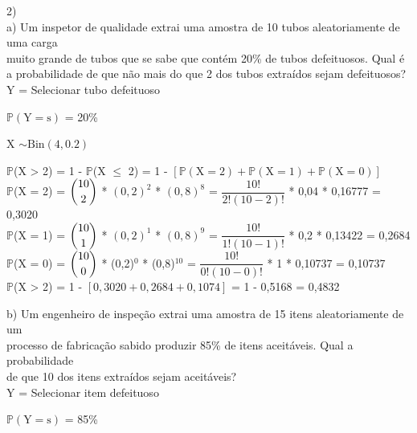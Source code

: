 \documentclass[12pt,a4paper,draft]{article}
\begin{document}
	2)\\
	a) Um inspetor de qualidade extrai uma amostra de 10 tubos aleatoriamente de uma carga\\ muito grande de tubos que se sabe que contém 20\% de tubos defeituosos. Qual é a probabilidade de  que não mais do que 2 dos tubos	extraídos sejam defeituosos?
	\vspace{0.5cm}\\
	Y = Selecionar tubo defeituoso
	\begin{center}
		\vspace{1cm}
		$\mathbb{P}\left(\text{Y} = \text{s}\right)$ = 20\%
		\vspace{1cm}\\
	\end{center}
	X $\sim \text{Bin}\left(4, 0.2\right)$
	\vspace{1cm}\\
	\begin{center}
		$\mathbb{P}$(X > 2) = 1 - $\mathbb{P}$(X $\leq$ 2) = 1 - $\left[\mathbb{P}(\text{X} = 2) + \mathbb{P}(\text{X} = 1) + \mathbb{P}(\text{X} = 0)\right]$
		\vspace{0.5cm}\\
		$\mathbb{P}$(X = 2) = $\dbinom{10}{2}$ * $\left(0,2\right)^2$ * $\left(0,8\right)^8$ = $\dfrac{10!}{2!(10-2)!}$ * 0,04 * 0,16777 = 0,3020
		\vspace{0.5cm}\\
		$\mathbb{P}$(X = 1) = $\dbinom{10}{1}$ * $\left(0,2\right)^1$ * $\left(0,8\right)^9$ = $\dfrac{10!}{1!(10-1)!}$ * 0,2 * 0,13422 = 0,2684
		\vspace{0.5cm}\\
		$\mathbb{P}$(X = 0) = $\dbinom{10}{0}$ * (0,2)$^{0}$ * (0,8)$^{10}$ = $\dfrac{10!}{0!(10-0)!}$ * 1 * 0,10737 = 0,10737
		\vspace{0.5cm}\\
		$\mathbb{P}$(X > 2) = 1 - $\left[0,3020 + 0,2684 + 0,1074\right]$ = 1 - 0,5168 = 0,4832
	\end{center}
	\vspace{1cm}
	b) Um engenheiro de inspeção extrai uma amostra de 15 itens aleatoriamente de um\\ processo de fabricação sabido produzir 85\% de itens aceitáveis. Qual a probabilidade\\ de que 10 dos itens extraídos sejam aceitáveis?
	\vspace{0.5cm}\\
	Y = Selecionar item defeituoso
	\begin{center}
		\vspace{1cm}
		$\mathbb{P}\left(\text{Y} = \text{s}\right)$ = 85\%
		\vspace{1cm}\\
	\end{center}
\end{document}
